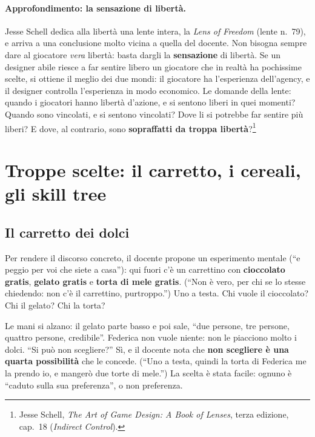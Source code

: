\paragraph{Approfondimento: la sensazione di libertà.} Jesse Schell dedica
alla libertà una lente intera, la \emph{Lens of Freedom} (lente n.~79), e
arriva a una conclusione molto vicina a quella del docente. Non bisogna
sempre dare al giocatore \emph{vera} libertà: basta dargli la
\textbf{sensazione} di libertà. Se un designer abile riesce a far sentire
libero un giocatore che in realtà ha pochissime scelte, si ottiene il meglio
dei due mondi: il giocatore ha l'esperienza dell'agency, e il designer
controlla l'esperienza in modo economico. Le domande della lente: quando i
giocatori hanno libertà d'azione, e si sentono liberi in quei momenti? Quando
sono vincolati, e si sentono vincolati? Dove li si potrebbe far sentire più
liberi? E dove, al contrario, sono \textbf{sopraffatti da troppa
libertà}?\footnote{Jesse Schell, \emph{The Art of Game Design: A Book of
Lenses}, terza edizione, cap.~18 (\emph{Indirect Control}).}

\section{Troppe scelte: il carretto, i cereali, gli skill tree}
\label{gd9:sec:troppe-scelte}



\subsection{Il carretto dei dolci}

Per rendere il discorso concreto, il docente propone un esperimento
mentale (``e peggio per voi che siete a casa''): qui fuori c'è un carrettino
con \textbf{cioccolato gratis}, \textbf{gelato gratis} e \textbf{torta di
mele gratis}. (``Non è vero, per chi se lo stesse chiedendo: non c'è il
carrettino, purtroppo.'') Uno a testa. Chi vuole il cioccolato? Chi il
gelato? Chi la torta?

Le mani si alzano: il gelato parte basso e poi sale, ``due persone, tre
persone, quattro persone, credibile''. Federica non vuole niente: non le
piacciono molto i dolci. ``Si può non scegliere?'' Sì, e il docente nota che
\textbf{non scegliere è una quarta possibilità} che le concede. (``Uno a
testa, quindi la torta di Federica me la prendo io, e mangerò due torte di
mele.'') La scelta è stata facile: ognuno è ``caduto sulla sua preferenza'',
o non preferenza.

